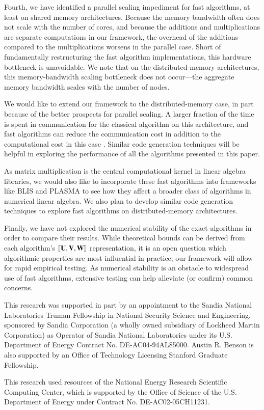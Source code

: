\documentclass[preprint]{sigplanconf}
\newcommand{\M}[2][]{{\bm{#1\mathbf{\MakeUppercase{#2}}}}}
\begin{document}
Fourth, we have identified a parallel scaling impediment for fast algorithms, at least on shared memory architectures. 
Because the memory bandwidth often does not scale with the number of cores, and because the additions and multiplications are separate computations in our framework, the overhead of the additions compared to the multiplications worsens in the parallel case.
Short of fundamentally restructuring the fast algorithm implementations, this hardware bottleneck is unavoidable.
We note that on the distributed-memory architectures, this memory-bandwidth scaling bottleneck does not occur---the aggregate memory bandwidth scales with the number of nodes.

We would like to extend our framework to the distributed-memory case, in part because of the better prospects for parallel scaling.
A larger fraction of the time is spent in communication for the classical algorithm on this architecture, and fast algorithms can reduce the communication cost in addition to the computational cost in this case \cite{ballard2012communication}.
Similar code generation techniques will be helpful in exploring the performance of all the algorithms presented in this paper.

As matrix multiplication is the central computational kernel in linear algebra libraries, we would also like to incorporate these fast algorithms into frameworks like BLIS \cite{BLIS1} and PLASMA \cite{kurzak2013multithreading} to see how they affect a broader class of algorithms in numerical linear algebra.
We also plan to develop similar code generation techniques to explore fast algorithms on distributed-memory architectures.

Finally, we have not explored the numerical stability of the exact algorithms in order to compare their results.
While theoretical bounds can be derived from each algorithm's $\alg{\M{U}}{\M{V}}{\M{W}}$ representation, it is an open question which algorithmic properties are most influential in practice; our framework will allow for rapid empirical testing.
As numerical stability is an obstacle to widespread use of fast algorithms, extensive testing can help alleviate (or confirm) common concerns.



\acks

This research was supported in part by an appointment to the Sandia National Laboratories Truman Fellowship in National Security Science and Engineering, sponsored by Sandia Corporation (a wholly owned subsidiary of Lockheed Martin Corporation) as Operator of Sandia National Laboratories under its U.S. Department of Energy Contract No. DE-AC04-94AL85000.
Austin R. Benson is also supported by an Office of Technology Licensing Stanford Graduate Fellowship.

This research used resources of the National Energy Research Scientific Computing Center, which is supported by the Office of Science of the U.S. Department of Energy under Contract No. DE-AC02-05CH11231.






\end{document}
